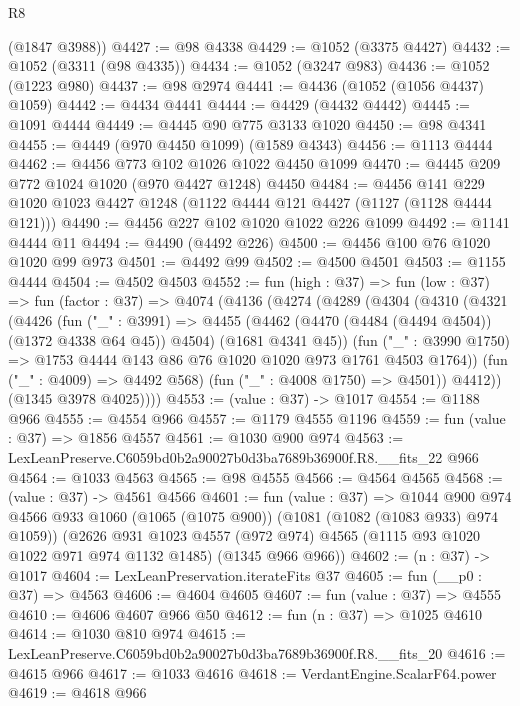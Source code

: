 \begin{lexlean}{R8}
\begin{coremodule}
      (@1847 @3988))
@4427 := @98 @4338
@4429 := @1052 (@3375 @4427)
@4432 := @1052 (@3311 (@98 @4335))
@4434 := @1052 (@3247 @983)
@4436 := @1052 (@1223 @980)
@4437 := @98 @2974
@4441 := @4436 (@1052 (@1056 @4437) @1059)
@4442 := @4434 @4441
@4444 := @4429 (@4432 @4442)
@4445 := @1091 @4444
@4449 := @4445 @90 @775 @3133 @1020
@4450 := @98 @4341
@4455 := @4449 (@970 @4450 @1099) (@1589 @4343)
@4456 := @1113 @4444
@4462 := @4456 @773 @102 @1026 @1022 @4450 @1099
@4470 := @4445 @209 @772 @1024 @1020 (@970 @4427 @1248) @4450
@4484 := @4456 @141 @229 @1020 @1023 @4427 @1248 (@1122 @4444 @121 @4427 (@1127 (@1128 @4444 @121)))
@4490 := @4456 @227 @102 @1020 @1022 @226 @1099
@4492 := @1141 @4444 @11
@4494 := @4490 (@4492 @226)
@4500 := @4456 @100 @76 @1020 @1020 @99 @973
@4501 := @4492 @99
@4502 := @4500 @4501
@4503 := @1155 @4444
@4504 := @4502 @4503
@4552 := fun (high : @37) =>
  fun (low : @37) =>
  fun (factor : @37) =>
  @4074
    (@4136
      (@4274
        (@4289
          (@4304
            (@4310
              (@4321
                (@4426
                  (fun ("_" : @3991) =>
                  @4455
                    (@4462 (@4470 (@4484 (@4494 @4504)) (@1372 @4338 @64 @45)) @4504)
                    (@1681 @4341 @45))
                  (fun ("_" : @3990 @1750) =>
                  @1753 @4444 @143 @86 @76 @1020 @1020 @973 @1761 @4503 @1764))
                (fun ("_" : @4009) => @4492 @568)
                (fun ("_" : @4008 @1750) => @4501))
              @4412))
          (@1345 @3978 @4025))))
@4553 := (value : @37) -> @1017
@4554 := @1188 @966
@4555 := @4554 @966
@4557 := @1179 @4555 @1196
@4559 := fun (value : @37) => @1856 @4557
@4561 := @1030 @900 @974
@4563 := LexLeanPreserve.C6059bd0b2a90027b0d3ba7689b36900f.R8.__fits_22 @966
@4564 := @1033 @4563
@4565 := @98 @4555
@4566 := @4564 @4565
@4568 := (value : @37) -> @4561 @4566
@4601 := fun (value : @37) =>
  @1044
    @900
    @974
    @4566
    @933
    @1060
    (@1065 (@1075 @900))
    (@1081 (@1082 (@1083 @933) @974 @1059))
    (@2626
      @931
      @1023
      @4557
      (@972 @974)
      @4565
      (@1115 @93 @1020 @1022 @971 @974 @1132 @1485)
      (@1345 @966 @966))
@4602 := (n : @37) -> @1017
@4604 := LexLeanPreservation.iterateFits @37
@4605 := fun (__p0 : @37) => @4563
@4606 := @4604 @4605
@4607 := fun (value : @37) => @4555
@4610 := @4606 @4607 @966 @50
@4612 := fun (n : @37) => @1025 @4610
@4614 := @1030 @810 @974
@4615 := LexLeanPreserve.C6059bd0b2a90027b0d3ba7689b36900f.R8.__fits_20
@4616 := @4615 @966
@4617 := @1033 @4616
@4618 := VerdantEngine.ScalarF64.power
@4619 := @4618 @966

\end{coremodule}
\end{lexlean}
